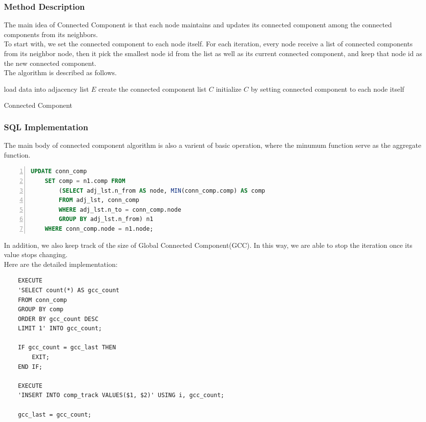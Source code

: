 \subsubsection{Method Description}
The main idea of Connected Component is that each node maintains and updates its connected component among the connected components from its neighbors. \\
To start with, we set the connected component to each node itself. For each iteration, every node receive a list of connected components from its neighbor node, then it pick the smallest node id from the list as well as its current connected component, and keep that node id as the new connected component. \\
The algorithm is described as follows.
\begin{algorithm}[htbp]
	\SetAlgoLined
	load data into adjacency list $E$\;
	create the connected component list $C$\;
	initialize $C$ by setting connected component to each node itself\;
	\caption{Connected Component}
	\label{cc}
\end{algorithm}

\subsubsection{SQL Implementation}
The main body of connected component algorithm is also a varient of basic operation, where the minumum function serve as the aggregate function.
\begin{lstlisting}[caption=Connected Component, label=cc, language=SQL, numbers=left, numberstyle=\tiny, breaklines, tabsize=2, frame=single, keepspaces=false]
	UPDATE conn_comp
	SET comp = n1.comp FROM 
		(SELECT adj_lst.n_from AS node, MIN(conn_comp.comp) AS comp
		FROM adj_lst, conn_comp
		WHERE adj_lst.n_to = conn_comp.node
		GROUP BY adj_lst.n_from) n1
	WHERE conn_comp.node = n1.node;
\end{lstlisting}
In addition, we also keep track of the size of Global Connected Component(GCC). In this way, we are able to stop the iteration once its value stops changing. \\
Here are the detailed implementation:
\begin{verbatim}
	EXECUTE 
	'SELECT count(*) AS gcc_count 
	FROM conn_comp 
	GROUP BY comp 
	ORDER BY gcc_count DESC 
	LIMIT 1' INTO gcc_count;

	IF gcc_count = gcc_last THEN
		EXIT;
	END IF;

	EXECUTE 
	'INSERT INTO comp_track VALUES($1, $2)' USING i, gcc_count;

	gcc_last = gcc_count;
\end{verbatim}

